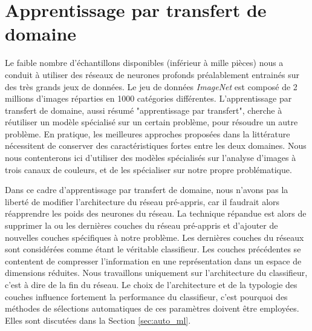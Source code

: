 \section{Apprentissage par transfert de domaine} \label{subsec:transfer_learning}

Le faible nombre d'échantillons disponibles (inférieur à mille pièces) nous a conduit à utiliser des réseaux de neurones profonds préalablement entrainés sur des très grands jeux de données.
Le jeu de données \textit{ImageNet} \cite{deng_imagenet_2009} est composé de 2 millions d'images réparties en 1000 catégories différentes.
L'apprentissage par transfert de domaine, aussi résumé "apprentissage par transfert", cherche à réutiliser un modèle spécialisé sur un certain problème, pour résoudre un autre problème.
En pratique, les meilleures approches proposées dans la littérature nécessitent de conserver des caractéristiques fortes entre les deux domaines.
Nous nous contenterons ici d'utiliser des modèles spécialisés sur l'analyse d'images à trois canaux de couleurs, et de les spécialiser sur notre propre problématique.

Dans ce cadre d'apprentissage par transfert de domaine, nous n'avons pas la liberté de modifier l'architecture du réseau pré-appris, car il faudrait alors réapprendre les poids des neurones du réseau.
La technique répandue est alors de supprimer la ou les dernières couches du réseau pré-appris et d'ajouter de nouvelles couches spécifiques à notre problème.
Les dernières couches du réseaux sont considérées comme étant le véritable classifieur.
Les couches précédentes se contentent de compresser l'information en une représentation dans un espace de dimensions réduites.
Nous travaillons uniquement sur l'architecture du classifieur, c'est à dire de la fin du réseau.
Le choix de l'architecture et de la typologie des couches influence fortement la performance du classifieur, c'est pourquoi des méthodes de sélections automatiques de ces paramètres doivent être employées.
Elles sont discutées dans la Section \ref{sec:auto_ml}.

